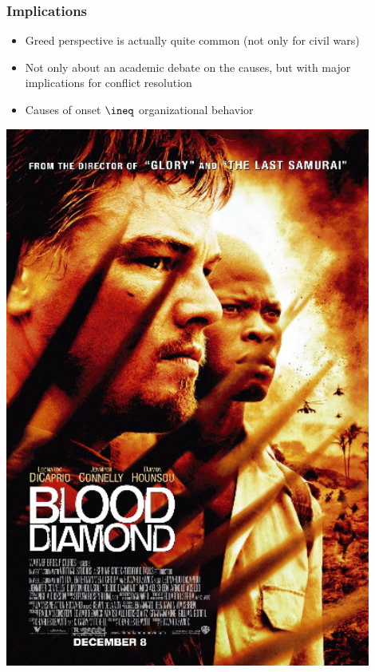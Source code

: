 \documentclass[utf8, xcolor=dvipsnames]{beamer}
\begin{document}
\begin{frame}
\frametitle{Implications}
\centering

\begin{minipage}{0.58\textwidth}\centering
\begin{itemize}
  \item Greed perspective is actually quite common {\small (not only for civil wars)}
  \item Not only about an academic debate on the causes, but with major implications for conflict resolution
  \item Causes of onset $\ineq$ organizational behavior
\end{itemize}
\end{minipage}\hfill
\begin{minipage}{0.40\textwidth}\centering
\includegraphics[width = 0.9\textwidth]{img/Blooddiamondposter}
\end{minipage}

\end{frame}
\end{document}
